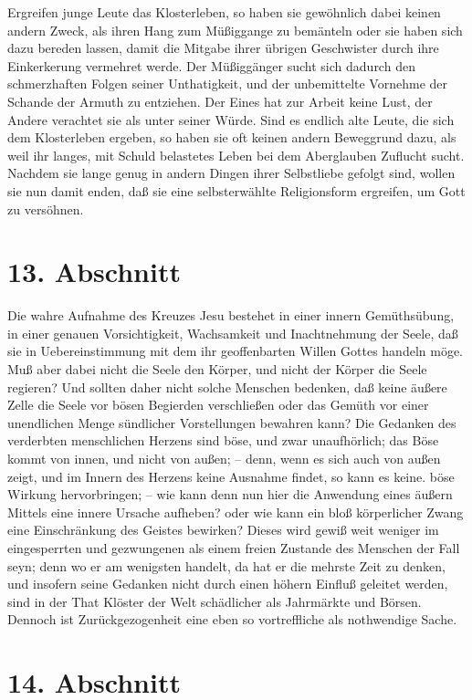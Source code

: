 Ergreifen junge Leute das Klosterleben, so haben sie gewöhnlich dabei keinen andern Zweck, als ihren Hang zum Müßiggange zu bemänteln oder sie haben sich dazu bereden lassen, damit die Mitgabe ihrer übrigen Geschwister durch ihre Einkerkerung vermehret werde. Der Müßiggänger sucht sich dadurch den schmerzhaften Folgen seiner Unthatigkeit, und der unbemittelte Vornehme der Schande der Armuth zu entziehen. Der Eines hat zur Arbeit keine Lust, der Andere verachtet sie als unter seiner Würde. Sind es endlich alte Leute, die sich dem Klosterleben ergeben, so haben sie oft keinen andern Beweggrund dazu, als weil ihr langes, mit Schuld belastetes Leben bei dem Aberglauben Zuflucht sucht. Nachdem sie lange genug in andern Dingen ihrer Selbstliebe gefolgt sind, wollen sie nun damit enden, daß sie eine selbsterwählte Religionsform ergreifen, um Gott zu versöhnen.

\section{13. Abschnitt}

Die wahre Aufnahme des Kreuzes Jesu bestehet in einer innern Gemüthsübung, in einer genauen Vorsichtigkeit, Wachsamkeit und Inachtnehmung der Seele, daß sie in Uebereinstimmung mit dem ihr geoffenbarten Willen Gottes handeln möge. Muß aber dabei nicht die Seele den Körper, und nicht der Körper die Seele regieren? Und sollten daher nicht solche Menschen bedenken, daß keine äußere Zelle die Seele vor bösen Begierden verschließen oder das Gemüth vor einer unendlichen Menge sündlicher Vorstellungen bewahren kann? Die Gedanken des verderbten menschlichen Herzens sind böse, und zwar unaufhörlich; das Böse kommt von innen, und nicht von außen; – denn, wenn es sich auch von außen zeigt, und im Innern des Herzens keine Ausnahme findet, so kann es keine. böse Wirkung hervorbringen; – wie kann denn nun hier die Anwendung eines äußern Mittels eine innere Ursache aufheben? oder wie kann ein bloß körperlicher Zwang eine Einschränkung des Geistes bewirken? Dieses wird gewiß weit weniger im eingesperrten und gezwungenen als einem freien Zustande des Menschen der Fall seyn; denn wo er am wenigsten handelt, da hat er die mehrste Zeit zu denken, und insofern seine Gedanken nicht durch einen höhern Einfluß geleitet werden, sind in der That Klöster der Welt schädlicher als Jahrmärkte und Börsen. Dennoch ist Zurückgezogenheit eine eben so vortreffliche als nothwendige Sache.

\section{14. Abschnitt}

